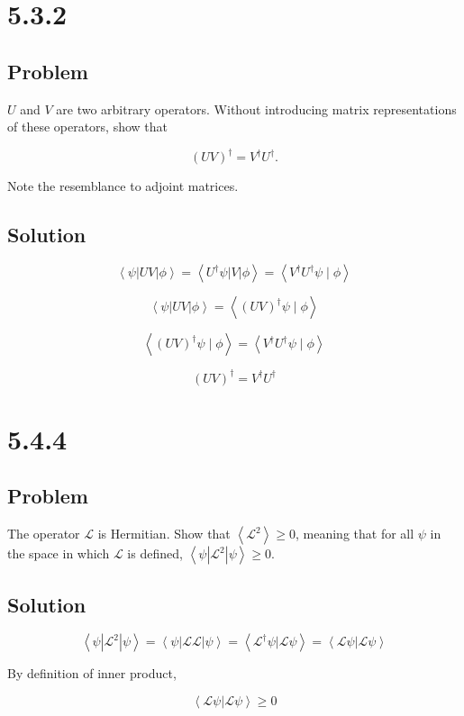 \documentclass[12pt]{article}
\begin{document}
\newpage
\section{5.3.2}

\subsection{Problem}

\(U\) and \(V\) are two arbitrary operators. Without introducing matrix representations of these operators, show that

\[
    {(U V)}^{\dagger}=V^{\dagger} U^{\dagger} .
\]

Note the resemblance to adjoint matrices.

\subsection{Solution}

\[
    \left\langle\psi\left|U V\right| \phi\right\rangle
    = \left\langle U^{\dagger} \psi \left|V\right| \phi\right\rangle
    = \left\langle V^{\dagger} U^{\dagger} \psi \mid \phi\right\rangle
\]

\[
    \left\langle\psi\left|U V\right| \phi\right\rangle
    = \left\langle {\left(U V\right) }^{\dagger} \psi \mid \phi\right\rangle
\]

\[
    \left\langle {\left(U V\right) }^{\dagger} \psi \mid \phi\right\rangle
    = \left\langle V^{\dagger} U^{\dagger} \psi \mid \phi\right\rangle
\]

\[
    {\left(U V\right) }^{\dagger} = V^{\dagger} U^{\dagger}
\]

\newpage
\section{5.4.4}

\subsection{Problem}

The operator \(\mathcal{L}\) is Hermitian. Show that \(\left\langle\mathcal{L}^2\right\rangle \geq 0\), meaning that for all \(\psi \) in the space in which \(\mathcal{L}\) is defined, \(\left\langle\psi\left|\mathcal{L}^2\right| \psi\right\rangle \geq 0\).

\subsection{Solution}

\[
    \left\langle\psi\left|\mathcal{L}^2\right| \psi\right\rangle
    = \left\langle\psi\left|\mathcal{L} \mathcal{L}\right| \psi\right\rangle
    = \left\langle\mathcal{L}^\dagger \psi |\mathcal{L} \psi\right\rangle
    = \left\langle\mathcal{L} \psi |\mathcal{L} \psi\right\rangle
\]

By definition of inner product,

\[
    \left\langle\mathcal{L} \psi |\mathcal{L} \psi\right\rangle \geq 0
\]

\newpage


\nocite{arfken2013mathematical}
\nocite{El-Deeb_PEU-356_Assignments}
\end{document}
